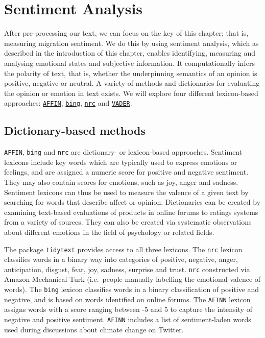 \documentclass[
  letterpaper,
  DIV=11,
  numbers=noendperiod]{scrreprt}
\begin{document}
\hypertarget{sentiment-analysis}{%
\section{Sentiment Analysis}\label{sentiment-analysis}}

After pre-processing our text, we can focus on the key of this chapter;
that is, measuring migration sentiment. We do this by using sentiment
analysis, which as described in the introduction of this chapter,
enables identifying, measuring and analysing emotional states and
subjective information. It computationally infers the polarity of text,
that is, whether the underpinning semantics of an opinion is positive,
negative or neutral. A variety of methods and dictionaries for
evaluating the opinion or emotion in text exists. We will explore four
different lexicon-based approaches:
\href{http://www2.imm.dtu.dk/pubdb/pubs/6010-full.html}{\texttt{AFFIN}},
\href{https://www.cs.uic.edu/~liub/FBS/sentiment-analysis.html}{\texttt{bing}},
\href{http://saifmohammad.com/WebPages/NRC-Emotion-Lexicon.htm}{\texttt{nrc}}
and \href{https://github.com/cjhutto/vaderSentiment}{\texttt{VADER}}.

\hypertarget{dictionary-based-methods}{%
\subsection{Dictionary-based methods}\label{dictionary-based-methods}}

\texttt{AFFIN}, \texttt{bing} and \texttt{nrc} are dictionary- or
lexicon-based approaches. Sentiment lexicons include key words which are
typically used to express emotions or feelings, and are assigned a
numeric score for positive and negative sentiment. They may also contain
scores for emotions, such as joy, anger and sadness. Sentiment lexicons
can thus be used to measure the valence of a given text by searching for
words that describe affect or opinion. Dictionaries can be created by
examining text-based evaluations of products in online forums to ratings
systems from a variety of sources. They can also be created via
systematic observations about different emotions in the field of
psychology or related fields.

The package \texttt{tidytext} provides access to all three lexicons. The
\texttt{nrc} lexicon classifies words in a binary way into categories of
positive, negative, anger, anticipation, disgust, fear, joy, sadness,
surprise and trust. \texttt{nrc} constructed via Amazon Mechanical Turk
(i.e.~people manually labelling the emotional valence of words). The
\texttt{bing} lexicon classifies words in a binary classification of
positive and negative, and is based on words identified on online
forums. The \texttt{AFINN} lexicon assigns words with a score ranging
between -5 and 5 to capture the intensity of negative and positive
sentiment. \texttt{AFINN} includes a list of sentiment-laden words used
during discussions about climate change on Twitter.
\end{document}
